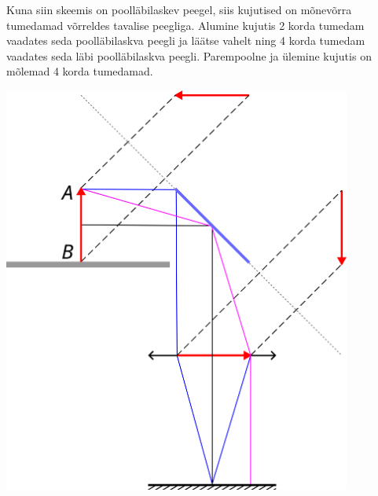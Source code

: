 Kuna siin skeemis on poolläbilaskev peegel, siis kujutised on mõnevõrra tumedamad võrreldes tavalise peegliga. Alumine kujutis 2 korda tumedam vaadates seda poolläbilaskva peegli ja läätse vahelt ning 4 korda tumedam vaadates seda läbi poolläbilaskva peegli. Parempoolne ja ülemine kujutis on mõlemad 4 korda tumedamad.
\begin{center}
  \includegraphics[width=0.86\textwidth]{2023-v3g-03-sol.png}
\end{center}
\probend